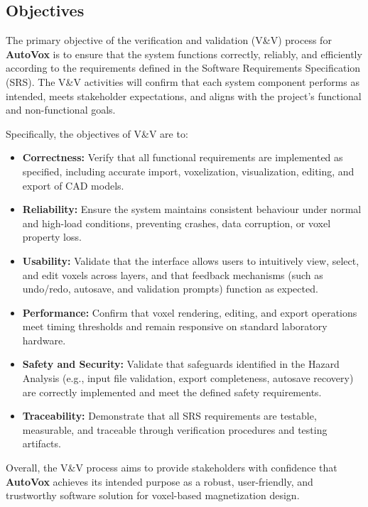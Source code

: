 \documentclass[12pt, titlepage]{article}
\begin{document}
\subsection{Objectives}

The primary objective of the verification and validation (V\&V) process for \textbf{AutoVox} is to ensure that the system functions correctly, reliably, and efficiently according to the requirements defined in the Software Requirements Specification (SRS). The V\&V activities will confirm that each system component performs as intended, meets stakeholder expectations, and aligns with the project’s functional and non-functional goals.

Specifically, the objectives of V\&V are to:

\begin{itemize}
  \item \textbf{Correctness:} Verify that all functional requirements are implemented as specified, including accurate import, voxelization, visualization, editing, and export of CAD models.
  \item \textbf{Reliability:} Ensure the system maintains consistent behaviour under normal and high-load conditions, preventing crashes, data corruption, or voxel property loss.
  \item \textbf{Usability:} Validate that the interface allows users to intuitively view, select, and edit voxels across layers, and that feedback mechanisms (such as undo/redo, autosave, and validation prompts) function as expected.
  \item \textbf{Performance:} Confirm that voxel rendering, editing, and export operations meet timing thresholds and remain responsive on standard laboratory hardware.
  \item \textbf{Safety and Security:} Validate that safeguards identified in the Hazard Analysis (e.g., input file validation, export completeness, autosave recovery) are correctly implemented and meet the defined safety requirements.
  \item \textbf{Traceability:} Demonstrate that all SRS requirements are testable, measurable, and traceable through verification procedures and testing artifacts.
\end{itemize}

Overall, the V\&V process aims to provide stakeholders with confidence that \textbf{AutoVox} achieves its intended purpose as a robust, user-friendly, and trustworthy software solution for voxel-based magnetization design.
\end{document}
